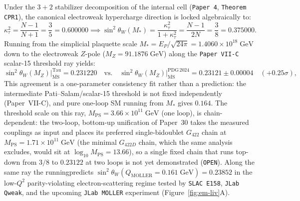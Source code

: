 \documentclass[11pt,a4paper]{article}
\begin{document}
Under the $3+2$ stabilizer decomposition of the internal cell (\texttt{Paper 4}, \texttt{Theorem CPR1}), the canonical electroweak hypercharge direction is locked algebraically to:
\begin{equation}
\kappa_\tau^2 = \frac{N-1}{N+1} = \frac{3}{5} = 0.600000 \implies \sin^2\theta_W(M_*) = \frac{\kappa_\tau^2}{1+\kappa_\tau^2} = \frac{N-1}{2N} = \frac{3}{8} = 0.375000.
\label{eq:weinberg-lock}
\end{equation}
Running from the simplicial plaquette scale $M_* = E_P/\sqrt{24\pi} = 1.4060\times 10^{18}\;\mathrm{GeV}$ down to the electroweak $Z$-pole ($M_Z = 91.1876\;\mathrm{GeV}$) along the \texttt{Paper VII-C} scalar-15 threshold ray yields:
\begin{equation}
\sin^2\theta_W(M_Z)\big|_{\overline{\mathrm{MS}}}^{\mathrm{Tau}} = 0.231220\quad\text{vs.}\quad
\sin^2\theta_W(M_Z)\big|_{\overline{\mathrm{MS}}}^{\mathrm{PDG\,2024}} = 0.23121 \pm 0.00004\quad(+0.25\sigma),
\end{equation}\noindent This agreement is a one-parameter consistency fit rather than a prediction: the intermediate Pati--Salam/\allowbreak scalar-15 threshold is not fixed independently (Paper~VII-C), and pure one-loop SM running from $M_*$ gives $0.164$. The threshold scale on this ray, $M_{\mathrm{PS}} = 3.66\times 10^{11}\;\mathrm{GeV}$ (one loop), is chain-dependent: the two-loop, bottom-up unification of Paper~30 takes the measured couplings as input and places its preferred single-bidoublet $G_{422}$ chain at $M_{\mathrm{PS}} = 1.71\times 10^{11}\;\mathrm{GeV}$ (the minimal $G_{422D}$ chain, which the same analysis excludes, would sit at $\log_{10}M_{\mathrm{PS}} = 13.66$), so a single fixed chain that runs top-down from $3/8$ to $0.23122$ at two loops is not yet demonstrated (\texttt{OPEN}). Along the same ray the runningpredicts $\sin^2\theta_W(Q_{\mathrm{MOLLER}}=0.161\;\mathrm{GeV}) = 0.23852$ in the low-$Q^2$ parity-violating electron-scattering regime tested by \texttt{SLAC E158}, \texttt{JLab Qweak}, and the upcoming \texttt{JLab MOLLER} experiment (Figure~\ref{fig:em-liv}A).
\end{document}
